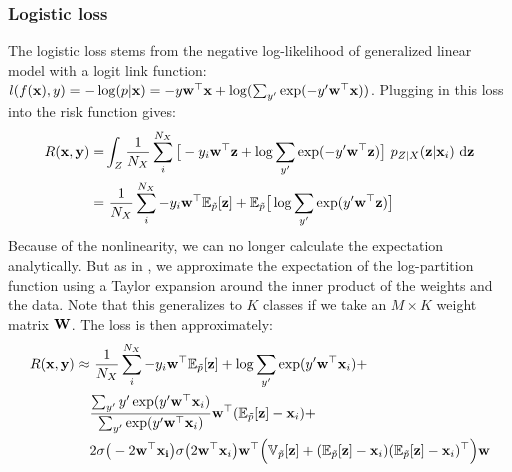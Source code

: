 \documentclass[twoside,11pt]{article}
\begin{document}
\subsubsection{Logistic loss}
The logistic loss stems from the negative log-likelihood of generalized linear model with a logit link function: $l(f({\bf x}),y)= -\log(p|{\bf x}) = -y{\bf w}^{\top}{\bf x} + \log(\sum_{y'} \exp(-y'{\bf w}^{\top}{\bf x}))$. Plugging in this loss into the risk function gives:
\begin{align}
	R({\bf x},{\bf y}) =& \int_{Z} \frac{1}{N_{X}} \sum^{N_{X}}_{i} \big[-y_{i}{\bf w}^{\top}{\bf z} + \log\sum_{y'} \exp(-y'{\bf w}^{\top}{\bf z}) \big] \ p_{Z|X}({\bf z}|{\bf x}_{i}) \ \mathrm{d}{\bf z} \nonumber \\
	=& \ \frac{1}{N_{X}} \sum_{i}^{N_{X}} - y_{i}{\bf w}^{\top}\mathbb{E}_{\tilde{p}}[{\bf z}] + \mathbb{E}_{\tilde{p}}\big[\log \sum_{y'} \exp( y'{\bf w}^{\top}{\bf z})\big] 
\end{align}
Because of the nonlinearity, we can no longer calculate the expectation analytically. %
But as in \cite{wager2013dropout}, we approximate the expectation of the log-partition function using a Taylor expansion around the inner product of the weights and the data. Note that this generalizes to $K$ classes if we take an $M \times K$ weight matrix ${\bf W}$. The loss is then approximately:
\begin{align}
R({\bf x},{\bf y}) \approx& \ \frac{1}{N_{X}} \sum_{i}^{N_{X}} - y_{i}{\bf w}^{\top}\mathbb{E}_{\tilde{p}}[{\bf z}] + \log \sum_{y'} \exp( y'{\bf w}^{\top}{\bf x}_{i}) + \nonumber \\
& \frac{\sum_{y'} y'\exp(y'{\bf w}^{\top}{\bf x}_{i})}{\sum_{y'}\exp(y'{\bf w}^{\top}{\bf x}_{i})}{\bf w}^{\top}(\mathbb{E}_{\tilde{p}}[{\bf z}]-{\bf x}_{i}) + \nonumber \\
& 2\sigma \big(-2{\bf w^{\top}x_{i}}\big)\sigma \big(2{\bf w^{\top}x}_{i}\big){\bf w}^{\top}\Big(\mathbb{V}_{\tilde{p}}[{\bf z}] + (\mathbb{E}_{\tilde{p}}[{\bf z}]-{\bf x}_{i})(\mathbb{E}_{\tilde{p}}[{\bf z}]-{\bf x}_{i})^{\top} \Big){\bf w} \label{log_loss}
\end{align}
\end{document}
